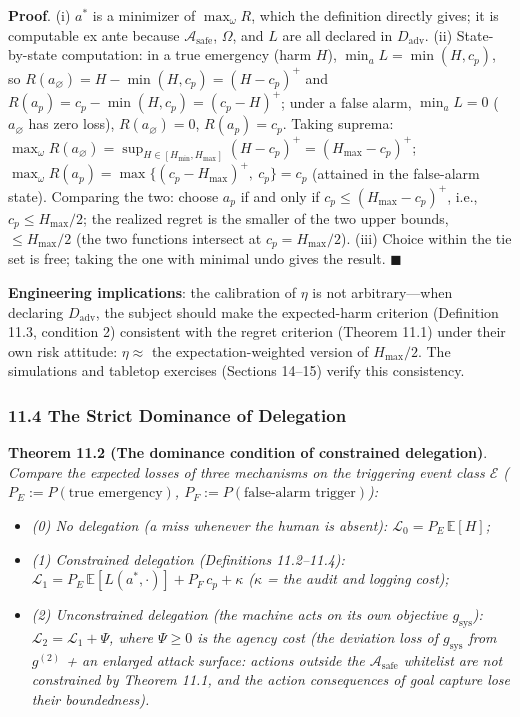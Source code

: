 \documentclass[
  11pt]{article}
\providecommand{\tightlist}{%
  \setlength{\itemsep}{0pt}\setlength{\parskip}{0pt}}
\begin{document}
\textbf{Proof}. (i) \(a^*\) is a minimizer of \(\max_\omega R\), which
the definition directly gives; it is computable ex ante because
\(\mathcal{A}_{\mathrm{safe}}\), \(\Omega\), and \(L\) are all declared
in \(D_{\mathrm{adv}}\). (ii) State-by-state computation: in a true
emergency (harm \(H\)), \(\min_a L = \min(H, c_p)\), so
\(R(a_\varnothing) = H - \min(H,c_p) = (H - c_p)^+\) and
\(R(a_p) = c_p - \min(H,c_p) = (c_p - H)^+\); under a false alarm,
\(\min_a L = 0\) (\(a_\varnothing\) has zero loss),
\(R(a_\varnothing) = 0\), \(R(a_p) = c_p\). Taking suprema:
\(\max_\omega R(a_\varnothing) = \sup_{H \in [H_{\min},H_{\max}]} (H-c_p)^+ = (H_{\max}-c_p)^+\);
\(\max_\omega R(a_p) = \max\{(c_p-H_{\max})^+,\ c_p\} = c_p\) (attained
in the false-alarm state). Comparing the two: choose \(a_p\) if and only
if \(c_p \le (H_{\max}-c_p)^+\), i.e., \(c_p \le H_{\max}/2\); the
realized regret is the smaller of the two upper bounds,
\(\le H_{\max}/2\) (the two functions intersect at
\(c_p = H_{\max}/2\)). (iii) Choice within the tie set is free; taking
the one with minimal \(\mathrm{undo}\) gives the result.
\(\blacksquare\)

\textbf{Engineering implications}: the calibration of \(\eta\) is not
arbitrary---when declaring \(D_{\mathrm{adv}}\), the subject should make
the expected-harm criterion (Definition 11.3, condition 2) consistent
with the regret criterion (Theorem 11.1) under their own risk attitude:
\(\eta \approx\) the expectation-weighted version of \(H_{\max}/2\). The
simulations and tabletop exercises (Sections 14--15) verify this
consistency.

\subsubsection{11.4 The Strict Dominance of
Delegation}\label{the-strict-dominance-of-delegation}

\textbf{Theorem 11.2 (The dominance condition of constrained
delegation)}. \emph{Compare the expected losses of three mechanisms on
the triggering event class \(\mathcal{E}\)
(\(P_E := P(\text{true emergency})\),
\(P_F := P(\text{false-alarm trigger})\)):}

\begin{itemize}
\tightlist
\item
  \emph{(0) No delegation (a miss whenever the human is absent):
  \(\mathcal{L}_0 = P_E\,\mathbb{E}[H]\);}
\item
  \emph{(1) Constrained delegation (Definitions 11.2--11.4):
  \(\mathcal{L}_1 = P_E\,\mathbb{E}[L(a^*,\cdot)] + P_F\, c_p + \kappa\)
  (\(\kappa\) = the audit and logging cost);}
\item
  \emph{(2) Unconstrained delegation (the machine acts on its own
  objective \(g_{\mathrm{sys}}\)):
  \(\mathcal{L}_2 = \mathcal{L}_1 + \Psi\), where \(\Psi \ge 0\) is the
  agency cost (the deviation loss of \(g_{\mathrm{sys}}\) from
  \(g^{(2)}\) + an enlarged attack surface: actions outside the
  \(\mathcal{A}_{\mathrm{safe}}\) whitelist are not constrained by
  Theorem 11.1, and the action consequences of goal capture lose their
  boundedness).}
\end{itemize}
\end{document}
